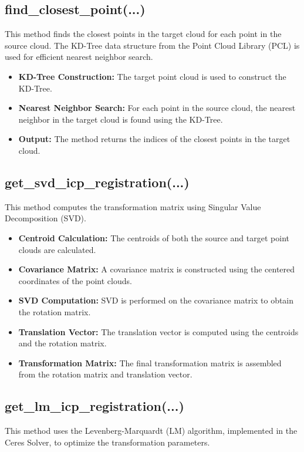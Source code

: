 \documentclass{article}
\begin{document}
\subsection{find\_closest\_point(...)}
This method finds the closest points in the target cloud for each point in the source cloud. The KD-Tree data structure from the Point Cloud Library (PCL) is used for efficient nearest neighbor search.

\begin{itemize}
    \item \textbf{KD-Tree Construction:} The target point cloud is used to construct the KD-Tree.
    \item \textbf{Nearest Neighbor Search:} For each point in the source cloud, the nearest neighbor in the target cloud is found using the KD-Tree.
    \item \textbf{Output:} The method returns the indices of the closest points in the target cloud.
\end{itemize}

\subsection{get\_svd\_icp\_registration(...)}
This method computes the transformation matrix using Singular Value Decomposition (SVD).

\begin{itemize}
    \item \textbf{Centroid Calculation:} The centroids of both the source and target point clouds are calculated.
    \item \textbf{Covariance Matrix:} A covariance matrix is constructed using the centered coordinates of the point clouds.
    \item \textbf{SVD Computation:} SVD is performed on the covariance matrix to obtain the rotation matrix.
    \item \textbf{Translation Vector:} The translation vector is computed using the centroids and the rotation matrix.
    \item \textbf{Transformation Matrix:} The final transformation matrix is assembled from the rotation matrix and translation vector.
\end{itemize}

\subsection{get\_lm\_icp\_registration(...)}
This method uses the Levenberg-Marquardt (LM) algorithm, implemented in the Ceres Solver, to optimize the transformation parameters.
\end{document}
